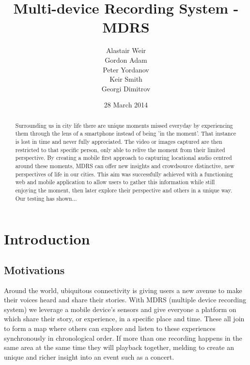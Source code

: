 \documentclass{l3proj}
\begin{document}
\setcounter{secnumdepth}{3}
\title{Multi-device Recording System - MDRS}
\author{Alastair Weir \\
        Gordon Adam \\
        Peter Yordanov \\
        Keir Smith \\
        Georgi Dimitrov}
\date{28 March 2014}
\maketitle
\begin{abstract}

Surrounding us in city life there are unique moments missed everyday by experiencing  them through the lens of a smartphone instead of being 'in the moment'. That instance is lost in time and never fully appreciated. The video or images captured are then restricted to that specific person, only able to relive the moment from their limited perspective. By creating a mobile first approach to capturing locational audio centred around these moments, MDRS can offer new insights and crowdsource distinctive, new  perspectives of life in our cities. This aim was successfully achieved with a functioning web and mobile application to allow users to gather this information while still enjoying the moment, then later explore their perspective and others in a unique way. Our testing has shown...

\end{abstract}
\educationalconsent
\tableofcontents
\chapter{Introduction}
\label{intro}

\section{Motivations}
Around the world, ubiquitous connectivity is giving users a new avenue to make their voices heard and share their stories. With MDRS (multiple device recording system) we leverage a mobile device’s sensors and give everyone a platform on which share their story, or experience, in a specific place and time. These all join to form a map where others can explore and listen to these experiences synchronously in chronological order. If more than one recording happens in the same area at the same time they will playback together, melding to create an unique and richer insight into an event such as a concert.
\end{document}
